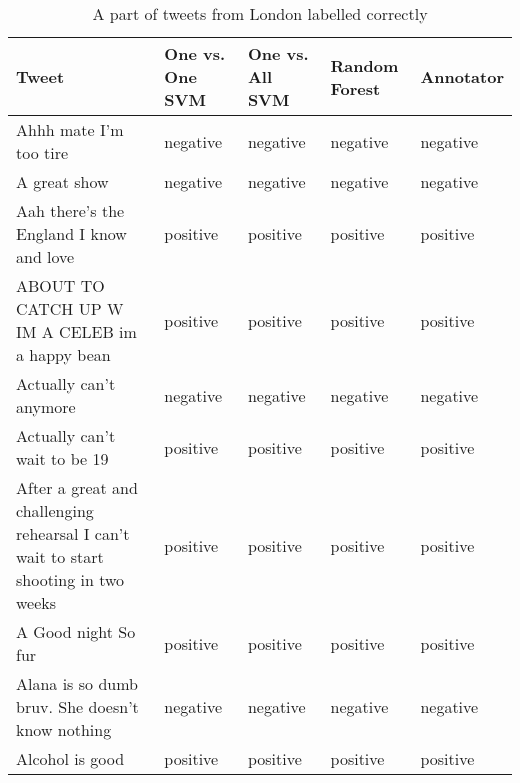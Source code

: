 \begin{table}[ht]
	\caption{A part of tweets from London labelled correctly}
	\begin{tabular}{|p{5cm}|p{1.8cm}|p{1.8cm}|p{1.8cm}|p{1.8cm}|} \hline
	Tweet & One vs. One SVM &One vs. All SVM &Random Forest & Annotator\\ \hline
	Ahhh mate I'm too tire & negative & negative & negative & negative \\ \hline
	A great show & negative & negative & negative & negative \\ \hline
	 Aah there's the England I know and love  & positive& positive& positive& positive \\ \hline
	ABOUT TO CATCH UP W IM A CELEB im a happy bean & positive & positive & positive& positive \\ \hline
	Actually can't anymore  & negative& negative& negative& negative \\ \hline

	Actually can't wait to be 19 & positive& positive& positive& positive \\ \hline
	After a great and challenging rehearsal I can't wait to start shooting in two weeks & positive & positive & positive &positive \\ \hline
	A Good night So fur & positive& positive& positive& positive \\ \hline
	Alana is so dumb bruv. She doesn't know nothing & negative & negative& negative& negative\\ \hline
	Alcohol is good & positive& positive& positive& positive\\ \hline



	\end{tabular}
	\label{tab:correct_tweets_en}
\end{table}


